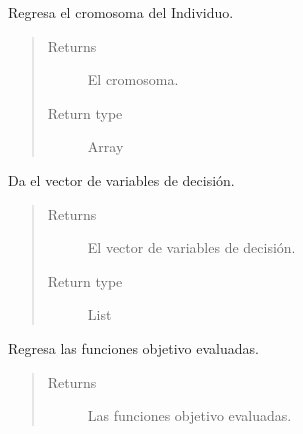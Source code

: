 \documentclass[letterpaper,10pt,english]{sphinxmanual}
\begin{document}
\begin{fulllineitems}
\begin{fulllineitems}
\end{fulllineitems}


\begin{fulllineitems}
\label{Model/Community/Population/Individual/Individual:Model.Community.Population.Individual.Individual.Individual.get_complete_chromosome}
Regresa el cromosoma del Individuo.
\begin{quote}\begin{description}
\item[{Returns}] \leavevmode
El cromosoma.

\item[{Return type}] \leavevmode
Array

\end{description}\end{quote}

\end{fulllineitems}


\begin{fulllineitems}
\label{Model/Community/Population/Individual/Individual:Model.Community.Population.Individual.Individual.Individual.get_decision_variables}
Da el vector de variables de decisión.
\begin{quote}\begin{description}
\item[{Returns}] \leavevmode
El vector de variables de decisión.

\item[{Return type}] \leavevmode
List

\end{description}\end{quote}

\end{fulllineitems}


\begin{fulllineitems}
\label{Model/Community/Population/Individual/Individual:Model.Community.Population.Individual.Individual.Individual.get_evaluated_functions}
Regresa las funciones objetivo evaluadas.
\begin{quote}\begin{description}
\item[{Returns}] \leavevmode
Las funciones objetivo evaluadas.


\end{description}
\end{quote}
\end{fulllineitems}
\end{fulllineitems}
\end{document}
